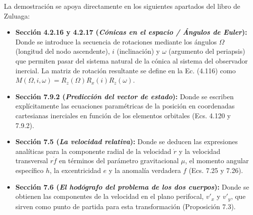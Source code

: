 \documentclass[12pt, a4paper]{article}
\begin{document}
La demostración se apoya directamente en los siguientes apartados del libro de Zuluaga:
\begin{itemize}
    \item \textbf{Sección 4.2.16 y 4.2.17 (\textit{Cónicas en el espacio / Ángulos de Euler}):} Donde se introduce la secuencia de rotaciones mediante los ángulos $\Omega$ (longitud del nodo ascendente), $i$ (inclinación) y $\omega$ (argumento del periapsis) que permiten pasar del sistema natural de la cónica al sistema del observador inercial. La matriz de rotación resultante se define en la Ec. (4.116) como $M(\Omega, i, \omega) = R_z(\Omega)R_x(i)R_z(\omega)$.
    \item \textbf{Sección 7.9.2 (\textit{Predicción del vector de estado}):} Donde se escriben explícitamente las ecuaciones paramétricas de la posición en coordenadas cartesianas inerciales en función de los elementos orbitales (Ecs. 4.120 y 7.9.2).
    \item \textbf{Sección 7.5 (\textit{La velocidad relativa}):} Donde se deducen las expresiones analíticas para la componente radial de la velocidad $\dot{r}$ y la velocidad transversal $r\dot{f}$ en términos del parámetro gravitacional $\mu$, el momento angular específico $h$, la excentricidad $e$ y la anomalía verdadera $f$ (Ecs. 7.25 y 7.26).
    \item \textbf{Sección 7.6 (\textit{El hodógrafo del problema de los dos cuerpos}):} Donde se obtienen las componentes de la velocidad en el plano perifocal, $v'_x$ y $v'_y$, que sirven como punto de partida para esta transformación (Proposición 7.3).
\end{itemize}
\end{document}
